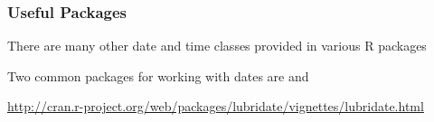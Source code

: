 \documentclass[12pt]{beamer}\usepackage[]{graphicx}\usepackage[]{color}
\begin{document}

\begin{frame}
\frametitle{Useful Packages}

\bi
  \item There are many other date and time classes provided in various R packages
  \item Two common packages for working with dates are  and 
  \item {\tiny \url{http://cran.r-project.org/web/packages/lubridate/vignettes/lubridate.html}}
\ei

\end{frame}

\end{document}
